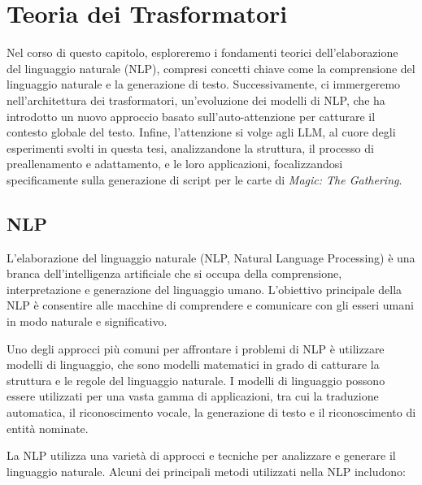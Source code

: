 \chapter{Teoria dei Trasformatori}\label{chapter:llm-theory}
Nel corso di questo capitolo, esploreremo i fondamenti teorici dell'elaborazione del linguaggio naturale (NLP), compresi concetti chiave come la comprensione del linguaggio naturale e la generazione di testo. Successivamente, ci immergeremo nell'architettura dei trasformatori, un'evoluzione dei modelli di NLP, che ha introdotto un nuovo approccio basato sull'auto-attenzione per catturare il contesto globale del testo. Infine, l'attenzione si volge agli LLM, al cuore degli esperimenti svolti in questa tesi, analizzandone la struttura, il processo di preallenamento e adattamento, e le loro applicazioni, focalizzandosi specificamente sulla generazione di script per le carte di \emph{Magic: The Gathering}.


\section{NLP}\label{sec:nlp}
L'elaborazione del linguaggio naturale (NLP, Natural Language Processing) è una branca dell'intelligenza artificiale che si occupa della comprensione, interpretazione e generazione del linguaggio umano. L'obiettivo principale della NLP è consentire alle macchine di comprendere e comunicare con gli esseri umani in modo naturale e significativo.

Uno degli approcci più comuni per affrontare i problemi di NLP è utilizzare modelli di linguaggio, che sono modelli matematici in grado di catturare la struttura e le regole del linguaggio naturale. I modelli di linguaggio possono essere utilizzati per una vasta gamma di applicazioni, tra cui la traduzione automatica, il riconoscimento vocale, la generazione di testo e il riconoscimento di entità nominate.

La NLP utilizza una varietà di approcci e tecniche per analizzare e generare il linguaggio naturale. Alcuni dei principali metodi utilizzati nella NLP includono:

